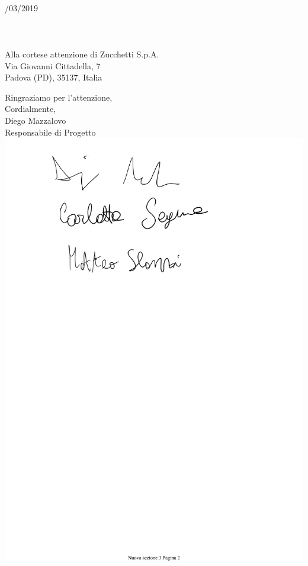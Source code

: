 \documentclass[11pt, a4paper]{letter} %
\begin{document}
\begin{letter}{
	\-\\/03/2019
	\-\\\-\\\-\\\-\\
	Alla cortese attenzione di Zucchetti S.p.A. \\
	Via Giovanni Cittadella, 7\\
	Padova (PD), 35137, Italia
}
\closing{Ringraziamo per l'attenzione,\\
Cordialmente,\\
Diego Mazzalovo\\
Responsabile di Progetto
\includegraphics[scale=0.4]{images/DiegoMazzalovo.pdf}} 





\end{letter}
\end{document}
